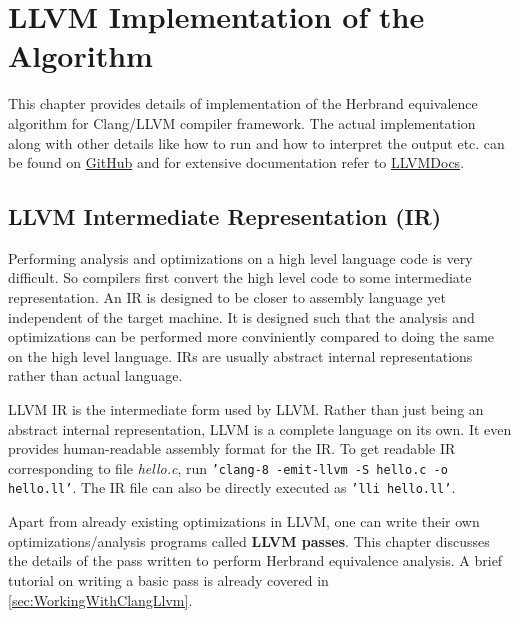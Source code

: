 \chapter{LLVM Implementation of the Algorithm}
\label{chap:chapter7}

This chapter provides details of implementation of the Herbrand equivalence 
algorithm for Clang/LLVM compiler framework. The actual implementation along 
with other details like how to run and how to interpret the output etc. can be 
found on \href{https://github.com/himanshu520/HerbrandEquivalence/tree/master/LLVM}{GitHub} 
and for extensive documentation refer to \href{https://himanshu520.github.io/HerbrandEquivalenceLLVMDocs/}{LLVMDocs}.

\section{LLVM Intermediate Representation (IR)}
\label{sec:LLVMIntermediateRepresentation}

Performing analysis and optimizations on a high level language code is very 
difficult. So compilers first convert the high level code to some intermediate 
representation. An IR is designed to be closer to assembly language yet 
independent of the target machine. It is designed such that the analysis and 
optimizations can be performed more conviniently compared to doing the same on 
the high level language. IRs are usually abstract internal representations 
rather than actual language.

LLVM IR is the intermediate form used by LLVM. Rather than just being an abstract
internal representation, LLVM is a complete language on its own. It even provides 
human-readable assembly format for the IR. To get readable IR corresponding to 
file \textit{hello.c}, run \texttt{'clang-8 -emit-llvm -S hello.c -o hello.ll'}. 
The IR file can also be directly executed as \texttt{'lli hello.ll'}.

Apart from already existing optimizations in LLVM, one can write their own 
optimizations/analysis programs called \textbf{LLVM passes}. This chapter 
discusses the details of the pass written to perform Herbrand equivalence 
analysis. A brief tutorial on writing a basic pass is already covered in 
\autoref{sec:WorkingWithClangLlvm}.

